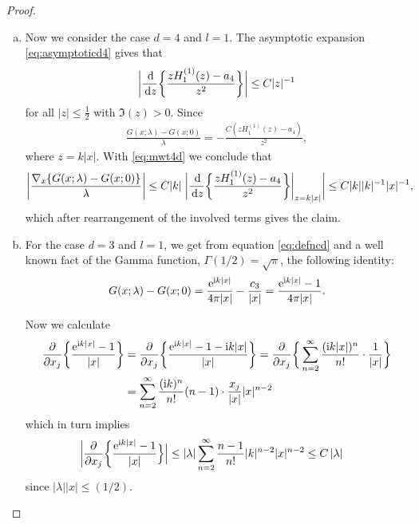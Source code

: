 \begin{proof}
\begin{enumerate}[(a)]
  \item Now we consider the case $d = 4$ and $l = 1$.
    The asymptotic expansion \eqref{eq:asymptoticd4} gives that
    \begin{align}
      \label{eq:mwt4d}
      \bigg| \frac{\, {\operatorname{d}\!{}}}{\, {\operatorname{d}\!{z}}} \bigg\{ \frac{z H_1^{(1)}(z) - a_4}{z^2} \bigg\} \bigg| \leq C |z|^{-1}
    \end{align}
    for all $|z| \leq \frac{1}{2}$ with $\Im(z) > 0$.
    Since
    \begin{align*}
      \frac{G(x; \lambda) - G(x; 0)}{\lambda} = - \frac{C (z H_1^{(1)}(z) - a_4)}{z^2},
    \end{align*}
    where $z = k |x|$. With \eqref{eq:mwt4d} we conclude that
    \begin{align*}
      \bigg|\frac{\nabla_x \{ G(x; \lambda) - G(x; 0) \}}{\lambda} \bigg|
      \leq C |k| \; \bigg| \frac{\, {\operatorname{d}\!{}}}{\, {\operatorname{d}\!{z}}} \bigg\{ \frac{z H_1^{(1)}(z) - a_4}{z^2} \bigg\} \bigg|_{z = k|x|} \bigg|
      \leq C |k| |k|^{-1} |x|^{-1},
    \end{align*}
    which after rearrangement of the involved terms gives the claim.

  \item For the case $d = 3$ and $l = 1$, we get from equation \eqref{eq:defncd} and a well known fact of the Gamma function, $\Gamma(1/2) = \sqrt{\pi}$, the following identity:
    \begin{align*}
      G(x;\lambda) - G(x; 0) = \frac{\mathrm{e}^{\mathrm{i} k |x|}}{4\pi |x|} - \frac{c_3}{|x|} = \frac{\mathrm{e}^{\mathrm{i} k|x|} - 1}{4 \pi |x|}.
    \end{align*}

    Now we calculate
    \begin{align*}
      \frac{\partial}{\partial x_j} \bigg\{ \frac{\mathrm{e}^{\mathrm{i} k|x|} - 1}{|x|} \bigg\} 
      &= \frac{\partial}{\partial x_j} \bigg\{ \frac{\mathrm{e}^{\mathrm{i} k |x|} - 1 - \mathrm{i} k |x|}{|x|} \bigg\} 
      = \frac{\partial}{\partial x_j} \bigg\{ \sum_{n = 2}^\infty \frac{(\mathrm{i} k |x|)^n}{n!} \cdot \frac{1}{|x|} \bigg\} \\
      &= \sum_{n = 2}^\infty \frac{(\mathrm{i} k)^n}{n!} (n - 1) \cdot \frac{x_j}{|x|} |x|^{n - 2} 
    \end{align*}
    which in turn implies 
    \begin{align*}
      \bigg| \frac{\partial}{\partial x_j} \bigg\{ \frac{\mathrm{e}^{\mathrm{i} k |x|} - 1}{|x|} \Big\} \Big|
      &\leq |\lambda| \sum_{n = 2}^\infty \frac{n - 1}{n!} |k|^{n - 2} |x|^{n - 2} 
      \leq C \, |\lambda|
    \end{align*}
    since $|\lambda||x| \leq (1/2)$.


\end{enumerate}
\end{proof}
